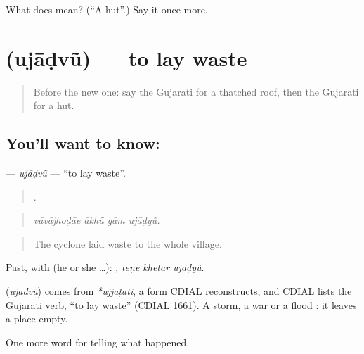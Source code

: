\begin{tcolorbox}[breakable,colback=teal!4,colframe=teal!35!black,title={Before you move on}]
What does  mean? (\textquotedblleft{}A hut\textquotedblright{}.) Say it once more.
\end{tcolorbox}
\section[\texorpdfstring{\gu{ઉજાડવું} (ujāḍvũ)}{ઉજાડવું (ujāḍvũ)}]{ (ujāḍvũ) — to lay waste}

\label{lesson:GU-C303-ujadvu}



\begin{quote}
Before the new one: say the Gujarati for a thatched roof, then the Gujarati for a hut.
\end{quote}

\subsection*{You'll want to know: }
\textbf{} — \emph{ujāḍvũ} — \textquotedblleft{}to lay waste\textquotedblright{}.

\begin{quote}
   .
\end{quote}

\begin{quote}
\emph{vāvājhoḍāe ākhũ gām ujāḍyũ.}
\end{quote}

\begin{quote}
The cyclone laid waste to the whole village.
\end{quote}

Past, with  (he or she …):   , \emph{teṇe khetar ujāḍyũ}.

\begin{cousinweb}
\textbf{} (\emph{ujāḍvũ}) comes from \emph{*ujjaṭati}, a form CDIAL reconstructs, and CDIAL lists the Gujarati verb, \textquotedblleft{}to lay waste\textquotedblright{} (CDIAL 1661). A storm, a war or a flood \textbf{ }: it leaves a place empty.
\end{cousinweb}

\begin{grammarlens}[title={What you've built}]
One more word for telling what happened.
\end{grammarlens}

